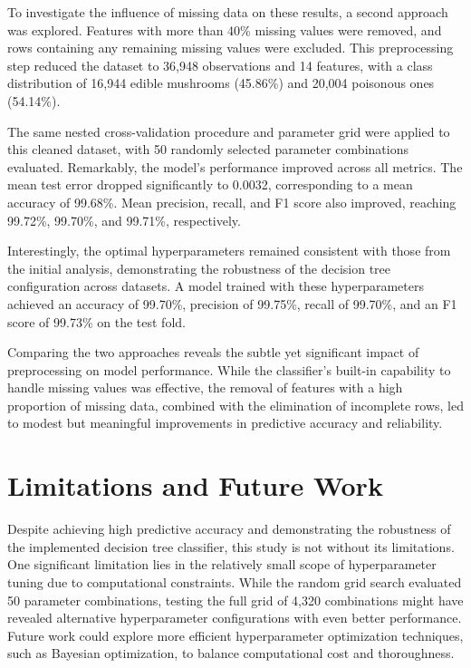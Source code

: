 \documentclass{article}
\begin{document}
To investigate the influence of missing data on these results, a second approach was explored. Features with more than 40\% missing values were removed, and rows containing any remaining missing values were excluded. This preprocessing step reduced the dataset to 36,948 observations and 14 features, with a class distribution of 16,944 edible mushrooms (45.86\%) and 20,004 poisonous ones (54.14\%).

The same nested cross-validation procedure and parameter grid were applied to this cleaned dataset, with 50 randomly selected parameter combinations evaluated. Remarkably, the model's performance improved across all metrics. The mean test error dropped significantly to 0.0032, corresponding to a mean accuracy of 99.68\%. Mean precision, recall, and F1 score also improved, reaching 99.72\%, 99.70\%, and 99.71\%, respectively.

Interestingly, the optimal hyperparameters remained consistent with those from the initial analysis, demonstrating the robustness of the decision tree configuration across datasets. A model trained with these hyperparameters achieved an accuracy of 99.70\%, precision of 99.75\%, recall of 99.70\%, and an F1 score of 99.73\% on the test fold.

Comparing the two approaches reveals the subtle yet significant impact of preprocessing on model performance. While the classifier's built-in capability to handle missing values was effective, the removal of features with a high proportion of missing data, combined with the elimination of incomplete rows, led to modest but meaningful improvements in predictive accuracy and reliability.

\section{Limitations and Future Work}

Despite achieving high predictive accuracy and demonstrating the robustness of the implemented decision tree classifier, this study is not without its limitations. One significant limitation lies in the relatively small scope of hyperparameter tuning due to computational constraints. While the random grid search evaluated 50 parameter combinations, testing the full grid of 4,320 combinations might have revealed alternative hyperparameter configurations with even better performance. Future work could explore more efficient hyperparameter optimization techniques, such as Bayesian optimization, to balance computational cost and thoroughness.
\end{document}
